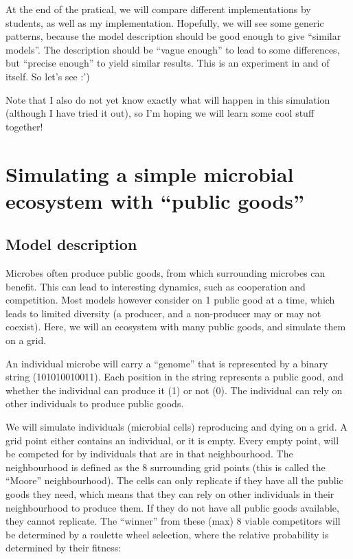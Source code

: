 \documentclass[
  letterpaper,
  DIV=11,
  numbers=noendperiod]{scrreprt}
\theoremstyle{definition}
\theoremstyle{remark}
\begin{document}
At the end of the pratical, we will compare different implementations by
students, as well as my implementation. Hopefully, we will see some
generic patterns, because the model description should be good enough to
give ``similar models''. The description should be ``vague enough'' to
lead to some differences, but ``precise enough'' to yield similar
results. This is an experiment in and of itself. So let's see :')

Note that I also do not yet know exactly what will happen in this
simulation (although I have tried it out), so I'm hoping we will learn
some cool stuff together!

\section{Simulating a simple microbial ecosystem with ``public
goods''}\label{simulating-a-simple-microbial-ecosystem-with-public-goods}

\subsection{Model description}\label{model-description}

Microbes often produce public goods, from which surrounding microbes can
benefit. This can lead to interesting dynamics, such as cooperation and
competition. Most models however consider on 1 public good at a time,
which leads to limited diversity (a producer, and a non-producer may or
may not coexist). Here, we will an ecosystem with many public goods, and
simulate them on a grid.

An individual microbe will carry a ``genome'' that is represented by a
binary string (101010010011). Each position in the string represents a
public good, and whether the individual can produce it (1) or not (0).
The individual can rely on other individuals to produce public goods.

We will simulate individuals (microbial cells) reproducing and dying on
a grid. A grid point either contains an individual, or it is empty.
Every empty point, will be competed for by individuals that are in that
neighbourhood. The neighbourhood is defined as the 8 surrounding grid
points (this is called the ``Moore'' neighbourhood). The cells can only
replicate if they have all the public goods they need, which means that
they can rely on other individuals in their neighbourhood to produce
them. If they do not have all public goods available, they cannot
replicate. The ``winner'' from these (max) 8 viable competitors will be
determined by a roulette wheel selection, where the relative probability
is determined by their fitness:
\end{document}
